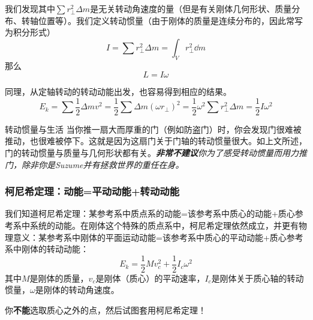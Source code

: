 我们发现其中$\sum r_\perp^2 \Delta m$是无关转动角速度的量（但是有关刚体几何形状、质量分布、转轴位置等）。我们定义转动惯量（由于刚体的质量是连续分布的，因此常写为积分形式）
$$
I =\sum r_\perp^2 \Delta m = \int_V r_\perp^2 \dd m
$$
那么
$$ L = I \omega$$

同理，从定轴转动的转动动能出发，也容易得到相应的结果。
$$E_k = \sum \frac{1}{2} \Delta m v^2 = \frac{1}{2} \sum \Delta m (\omega r_\perp)^2 = \frac{1}{2} \omega^2 \sum r_\perp^2 \Delta m = \frac{1}{2} I \omega^2$$

\begin{example}{转动惯量与生活}
当你推一扇大而厚重的门（例如防盗门）时，你会发现门很难被推动，也很难被停下。这就是因为这扇门关于门轴的转动惯量很大。如上文所述，门的转动惯量与质量与几何形状都有关。\textsl{\textbf{非常不建议}你为了感受转动惯量而用力推门，除非你是Suzume并有拯救世界的重任在身。}
\end{example}

\subsubsection{柯尼希定理：动能=平动动能+转动动能}
我们知道柯尼希定理：某参考系中质点系的动能=该参考系中质心的动能+质心参考系中系统的动能。在刚体这个特殊的质点系中，柯尼希定理依然成立，并更有物理意义：某参考系中刚体的平面运动动能=该参考系中质心的平动动能+质心参考系中刚体的转动动能：
$$E_k = \frac{1}{2}Mv_c^2 + \frac{1}{2} I_c \omega^2$$
其中$M$是刚体的质量，$v_c$是刚体（质心）的平动速率，$I_c$是刚体关于质心轴的转动惯量，$\omega$是刚体的转动角速度。

你\textbf{不能}选取质心之外的点，然后试图套用柯尼希定理！


